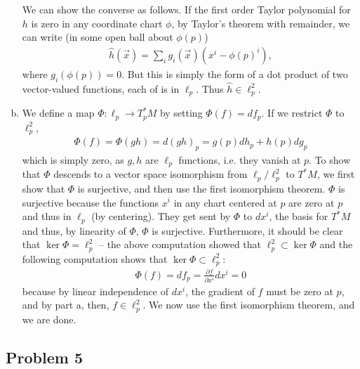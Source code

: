 \documentclass{../../mathnotes}
\begin{document}
\begin{enumerate}[(a)]
        We can show the converse as follows. If the first order Taylor polynomial for $h$ is zero in any coordinate chart $\phi$, by Taylor's theorem
        with remainder, we can write (in some open ball about $\phi(p)$)
        \begin{align*}
            \hat h(\vec x)=\sum_i g_i(\vec x)(x^i-\phi(p)^i),
        \end{align*}
        where $g_i(\phi(p))=0$. But this is simply the form of a dot product of two vector-valued functions, each of is in $\ell_p$.
        Thus $\hat h\in\ell_p^2$.
    \item We define a map $\Phi:\ell_p\to T_p^*M$ by setting $\Phi(f)=df_p$. If we restrict $\Phi$ to $\ell_p^2$,
        \begin{align*}
            \Phi(f)=\Phi(gh)=d(gh)_p=g(p)dh_p+h(p)dg_p
        \end{align*}
        which is simply zero, as $g,h$ are $\ell_p$ functions, i.e. they vanish at $p$. To show that $\Phi$ descends to a vector
        space isomorphism from $\ell_p/\ell_p^2$ to $T^*M$, we first show that $\Phi$ is surjective, and then use the first isomorphism theorem.
        $\Phi$ is surjective because the functions $x^i$ in any chart centered at $p$ are zero at $p$ and thus in $\ell_p$ (by centering).
        They get sent by $\Phi$ to $dx^i$, the basis for $T^*M$ and thus, by linearity of $\Phi$, $\Phi$ is surjective.
        Furthermore, it should be clear that $\ker\Phi=\ell_p^2$ -- the above computation showed that $\ell_p^2\subset\ker\Phi$ and the following
        computation shows that $\ker\Phi\subset\ell_p^2$:
        \begin{align*}
            \Phi(f)=df_p=\frac{\partial f}{\partial x^i}dx^i=0
        \end{align*}
        because by linear independence of $dx^i$, the gradient of $f$ must be zero at $p$, and by part a, then, $f\in\ell^2_p$.
        We now use the first isomorphism theorem, and we are done.
\end{enumerate}

\subsection*{Problem 5}
\end{document}
